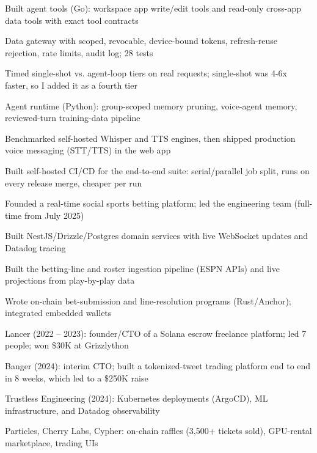 \documentclass[print]{jack-resume}
\begin{document}
\begin{tightemize}
    \item Built agent tools (Go): workspace app write/edit tools and read-only cross-app data tools with exact tool contracts
    \item Data gateway with scoped, revocable, device-bound tokens, refresh-reuse rejection, rate limits, audit log; 28 tests
    \item Timed single-shot vs. agent-loop tiers on real requests; single-shot was 4-6x faster, so I added it as a fourth tier
    \item Agent runtime (Python): group-scoped memory pruning, voice-agent memory, reviewed-turn training-data pipeline
    \item Benchmarked self-hosted Whisper and TTS engines, then shipped production voice messaging (STT/TTS) in the web app
    \item Built self-hosted CI/CD for the end-to-end suite: serial/parallel job split, runs on every release merge, cheaper per run
\end{tightemize}
\sectionsep

\begin{tightemize}
    \item Founded a real-time social sports betting platform; led the engineering team (full-time from July 2025)
    \item Built NestJS/Drizzle/Postgres domain services with live WebSocket updates and Datadog tracing
    \item Built the betting-line and roster ingestion pipeline (ESPN APIs) and live projections from play-by-play data
    \item Wrote on-chain bet-submission and line-resolution programs (Rust/Anchor); integrated embedded wallets
\end{tightemize}
\sectionsep

\begin{tightemize}
    \item Lancer (2022 – 2023): founder/CTO of a Solana escrow freelance platform; led 7 people; won \$30K at Grizzlython
    \item Banger (2024): interim CTO; built a tokenized-tweet trading platform end to end in 8 weeks, which led to a \$250K raise
    \item Trustless Engineering (2024): Kubernetes deployments (ArgoCD), ML infrastructure, and Datadog observability
    \item Particles, Cherry Labs, Cypher: on-chain raffles (3,500+ tickets sold), GPU-rental marketplace, trading UIs
\end{tightemize}
\sectionsep
\end{document}
